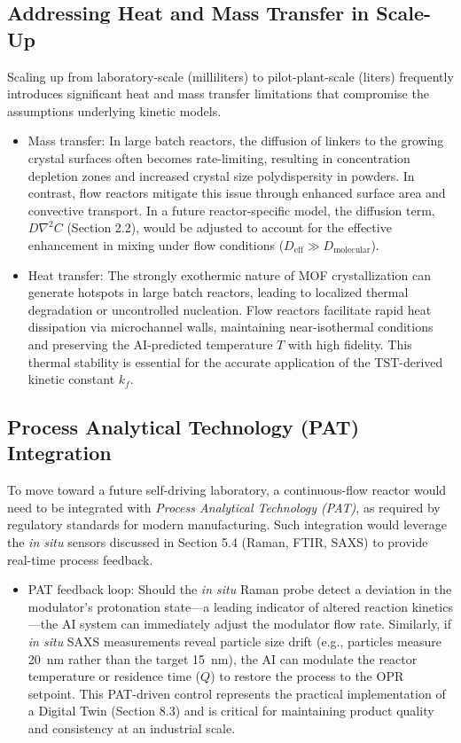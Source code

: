 \documentclass[12pt,a4paper]{article}
\begin{document}
\subsection{Addressing Heat and Mass Transfer in Scale-Up}

Scaling up from laboratory-scale (milliliters) to pilot-plant-scale (liters) frequently introduces significant heat and mass transfer limitations that compromise the assumptions underlying kinetic models.

\begin{itemize}
    \item Mass transfer: In large batch reactors, the diffusion of linkers to the growing crystal surfaces often becomes rate-limiting, resulting in concentration depletion zones and increased crystal size polydispersity in powders. In contrast, flow reactors mitigate this issue through enhanced surface area and convective transport. In a future reactor-specific model, the diffusion term, $D \nabla^2 C$ (Section 2.2), would be adjusted to account for the effective enhancement in mixing under flow conditions ($D_{\text{eff}} \gg D_{\text{molecular}}$).\cite{ref39}
    \item Heat transfer: The strongly exothermic nature of MOF crystallization can generate hotspots in large batch reactors, leading to localized thermal degradation or uncontrolled nucleation. Flow reactors facilitate rapid heat dissipation via microchannel walls, maintaining near-isothermal conditions and preserving the AI-predicted temperature $T$ with high fidelity. This thermal stability is essential for the accurate application of the TST-derived kinetic constant $k_f$.
\end{itemize}


\subsection{Process Analytical Technology (PAT) Integration}

To move toward a future self-driving laboratory, a continuous-flow reactor would need to be integrated with \textit{Process Analytical Technology (PAT)}, as required by regulatory standards for modern manufacturing. Such integration would leverage the \textit{in situ} sensors discussed in Section 5.4 (Raman, FTIR, SAXS) to provide real-time process feedback.

\begin{itemize}
    \item PAT feedback loop: Should the \textit{in situ} Raman probe detect a deviation in the modulator's protonation state—a leading indicator of altered reaction kinetics—the AI system can immediately adjust the modulator flow rate. Similarly, if \textit{in situ} SAXS measurements reveal particle size drift (e.g., particles measure 20~nm rather than the target 15~nm), the AI can modulate the reactor temperature or residence time ($Q$) to restore the process to the OPR setpoint. This PAT-driven control represents the practical implementation of a Digital Twin (Section 8.3) and is critical for maintaining product quality and consistency at an industrial scale.
\end{itemize}
\end{document}
